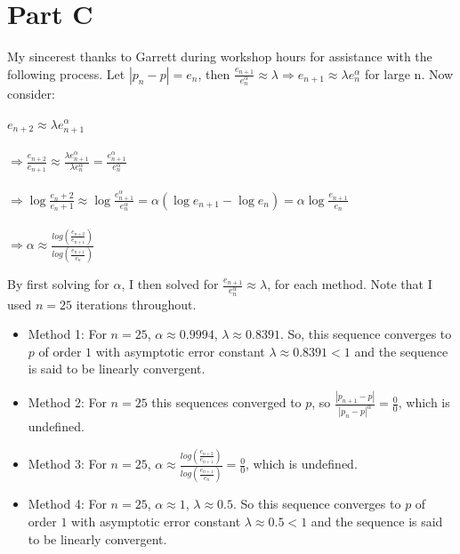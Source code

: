 \documentclass[11pt, oneside]{article}   	%
\begin{document}
\section*{Part C}

My sincerest thanks to Garrett during workshop hours for assistance with the following process. Let $|p_{n} - p| = e_n$, then $\frac{e_{n+1} }{e_n^\alpha} \approx \lambda \Rightarrow e_{n+1} \approx \lambda e_n ^ \alpha$  for large n. Now consider:

\begin{center}
$e_{n+2} \approx \lambda e_{n+1} ^ \alpha$ \\ 
$~$\\
$\Rightarrow \frac{e_{n+2}}{e_{n+1}} \approx \frac{\lambda e_{n+1} ^ \alpha}{\lambda e_{n} ^ \alpha} = \frac{e_{n+1} ^ \alpha}{e_{n} ^ \alpha}$\\
$~$\\
$\Rightarrow \log \frac{e_n+2}{e_n+1} \approx \log \frac{e_{n+1} ^ \alpha}{e_{n} ^ \alpha} = \alpha( \log e_{n+1} - \log e_n ) = \alpha \log \frac{e_{n+1}}{e_n}$\\
$~$\\
$\Rightarrow \alpha \approx \frac{ log ( \frac {e_{n+2}}{e_{n+1}} )}{ log ( \frac {e_{n+1}}{e_{n}} )}$
\end{center}

By first solving for $\alpha$, I then solved for $\frac{e_{n+1} }{e_n^\alpha} \approx \lambda$, for each method. Note that I used $n = 25$ iterations throughout.

\begin{itemize}

\item Method 1: For $n = 25$, $\alpha \approx  0.9994$, $\lambda \approx 0.8391$. So, this sequence converges to $p$ of order $1$ with asymptotic error constant $\lambda \approx 0.8391 < 1$ and the sequence is said to be linearly convergent.

\item Method 2: For $n = 25$ this sequences converged to $p$, so $\frac{|p_{n+1} - p|}{{|p_n - p|}^\alpha} = \frac{0}{0}$, which is undefined.

\item Method 3: For $n = 25$, $\alpha \approx \frac{ log ( \frac {e_{n+2}}{e_{n+1}} )}{ log ( \frac {e_{n+1}}{e_{n}} ) } = \frac{0}0$, which is undefined.

\item Method 4: For $n = 25$, $\alpha \approx 1$, $\lambda \approx 0.5$. So this sequence converges to $p$ of order $1$ with asymptotic error constant $\lambda \approx 0.5 < 1$ and the sequence is said to be linearly convergent.

\end{itemize}
\end{document}
